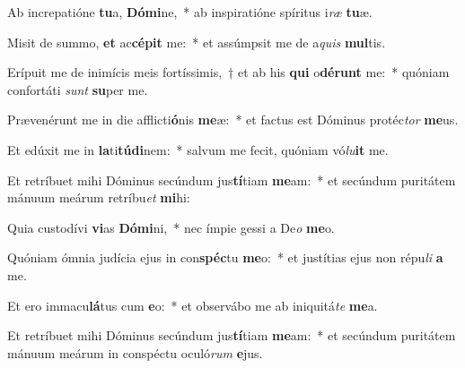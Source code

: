 \item Ab increpatióne \textbf{tu}a, \textbf{Dó}\textbf{mi}ne,~* ab inspiratióne spíritus i\textit{ræ} \textbf{tu}æ.
\item Misit de summo, \textbf{et} ac\textbf{cé}\textbf{pit} me:~* et assúmpsit me de a\textit{quis} \textbf{mul}tis.
\item Erípuit me de inimícis meis fortíssimis,~† et ab his \textbf{qui} o\textbf{dé}\textbf{runt} me:~* quóniam confortáti \textit{sunt} \textbf{su}per me.
\item Prævenérunt me in die afflicti\textbf{ó}nis \textbf{me}æ:~* et factus est Dóminus protéc\textit{tor} \textbf{me}us.
\item Et edúxit me in \textbf{la}ti\textbf{tú}\textbf{di}nem:~* salvum me fecit, quóniam vó\textit{lu}\textbf{it} me.
\item Et retríbuet mihi Dóminus secúndum jus\textbf{tí}tiam \textbf{me}am:~* et secúndum puritátem mánuum meárum retríbu\textit{et} \textbf{mi}hi:
\item Quia custodívi \textbf{vi}as \textbf{Dó}\textbf{mi}ni,~* nec ímpie gessi a De\textit{o} \textbf{me}o.
\item Quóniam ómnia judícia ejus in con\textbf{spéc}tu \textbf{me}o:~* et justítias ejus non répu\textit{li} \textbf{a} me.
\item Et ero immacu\textbf{lá}tus cum \textbf{e}o:~* et observábo me ab iniquitá\textit{te} \textbf{me}a.
\item Et retríbuet mihi Dóminus secúndum jus\textbf{tí}tiam \textbf{me}am:~* et secúndum puritátem mánuum meárum in conspéctu oculó\textit{rum} \textbf{e}jus.
